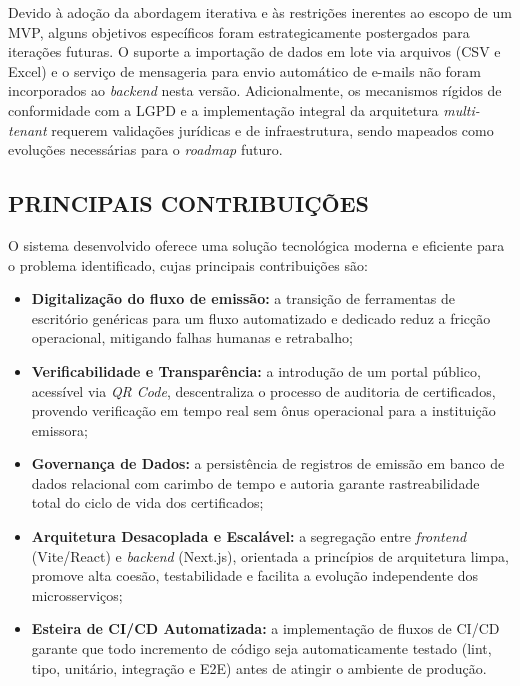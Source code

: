 \documentclass[12pt,openright,oneside,a4paper]{article}
\newcounter{rn}
\begin{document}
Devido à adoção da abordagem iterativa e às restrições inerentes ao escopo de um MVP, alguns objetivos específicos foram estrategicamente postergados para iterações futuras. O suporte a importação de dados em lote via arquivos (CSV e Excel) e o serviço de mensageria para envio automático de e-mails não foram incorporados ao \textit{backend} nesta versão. Adicionalmente, os mecanismos rígidos de conformidade com a LGPD e a implementação integral da arquitetura \textit{multi-tenant} requerem validações jurídicas e de infraestrutura, sendo mapeados como evoluções necessárias para o \textit{roadmap} futuro.

\subsection{PRINCIPAIS CONTRIBUIÇÕES}

O sistema desenvolvido oferece uma solução tecnológica moderna e eficiente para o problema identificado, cujas principais contribuições são:

\begin{itemize}
    \item \textbf{Digitalização do fluxo de emissão:} a transição de ferramentas de escritório genéricas para um fluxo automatizado e dedicado reduz a fricção operacional, mitigando falhas humanas e retrabalho;
    \item \textbf{Verificabilidade e Transparência:} a introdução de um portal público, acessível via \textit{QR Code}, descentraliza o processo de auditoria de certificados, provendo verificação em tempo real sem ônus operacional para a instituição emissora;
    \item \textbf{Governança de Dados:} a persistência de registros de emissão em banco de dados relacional com carimbo de tempo e autoria garante rastreabilidade total do ciclo de vida dos certificados;
    \item \textbf{Arquitetura Desacoplada e Escalável:} a segregação entre \textit{frontend} (Vite/React) e \textit{backend} (Next.js), orientada a princípios de arquitetura limpa, promove alta coesão, testabilidade e facilita a evolução independente dos microsserviços;
    \item \textbf{Esteira de CI/CD Automatizada:} a implementação de fluxos de CI/CD garante que todo incremento de código seja automaticamente testado (lint, tipo, unitário, integração e E2E) antes de atingir o ambiente de produção.
\end{itemize}
\end{document}
